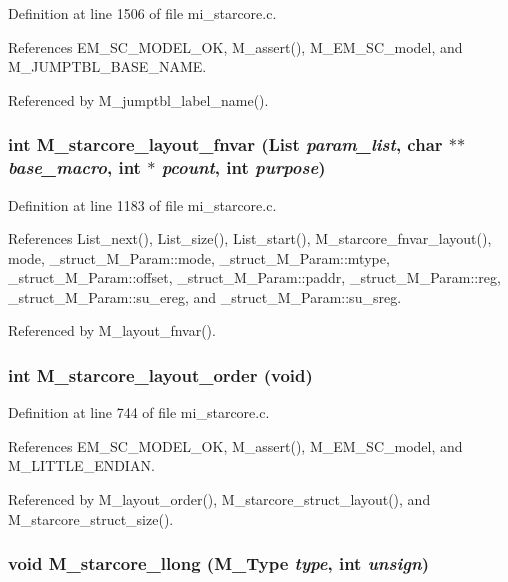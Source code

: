 Definition at line 1506 of file mi\_\-starcore.c.

References EM\_\-SC\_\-MODEL\_\-OK, M\_\-assert(), M\_\-EM\_\-SC\_\-model, and M\_\-JUMPTBL\_\-BASE\_\-NAME.

Referenced by M\_\-jumptbl\_\-label\_\-name().
\subsubsection{\setlength{\rightskip}{0pt plus 5cm}int M\_\-starcore\_\-layout\_\-fnvar (\bf{List} {\em param\_\-list}, char $\ast$$\ast$ {\em base\_\-macro}, int $\ast$ {\em pcount}, int {\em purpose})}\label{m__starcore_8h_0ddcfaf509551bf7f543544953b37207}




Definition at line 1183 of file mi\_\-starcore.c.

References List\_\-next(), List\_\-size(), List\_\-start(), M\_\-starcore\_\-fnvar\_\-layout(), mode, \_\-struct\_\-M\_\-Param::mode, \_\-struct\_\-M\_\-Param::mtype, \_\-struct\_\-M\_\-Param::offset, \_\-struct\_\-M\_\-Param::paddr, \_\-struct\_\-M\_\-Param::reg, \_\-struct\_\-M\_\-Param::su\_\-ereg, and \_\-struct\_\-M\_\-Param::su\_\-sreg.

Referenced by M\_\-layout\_\-fnvar().
\subsubsection{\setlength{\rightskip}{0pt plus 5cm}int M\_\-starcore\_\-layout\_\-order (void)}\label{m__starcore_8h_976396d3d486e2833fac9a71b066e06f}




Definition at line 744 of file mi\_\-starcore.c.

References EM\_\-SC\_\-MODEL\_\-OK, M\_\-assert(), M\_\-EM\_\-SC\_\-model, and M\_\-LITTLE\_\-ENDIAN.

Referenced by M\_\-layout\_\-order(), M\_\-starcore\_\-struct\_\-layout(), and M\_\-starcore\_\-struct\_\-size().
\subsubsection{\setlength{\rightskip}{0pt plus 5cm}void M\_\-starcore\_\-llong (\bf{M\_\-Type} {\em type}, int {\em unsign})}\label{m__starcore_8h_5170529e352bd65d721a8938afa5f1db}


